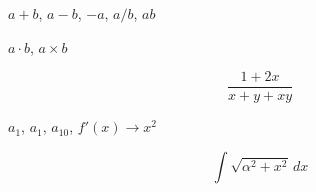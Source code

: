 \documentclass{sample}
\begin{document}
\begin{center}
$a+b$, $a-b$, $-a$, $a / b$, $a b$

$a \cdot b$, $a \times b$
\end{center}

\[
    \frac{1 + 2x}{x + y + xy}
\]

\begin{center}
    $a_{1}$, $a_1$, $a_{10}$, $f'(x) \to x^{2}$
\end{center}
\[\int \sqrt{\alpha^2+x^2}\,dx\]
\end{document}
